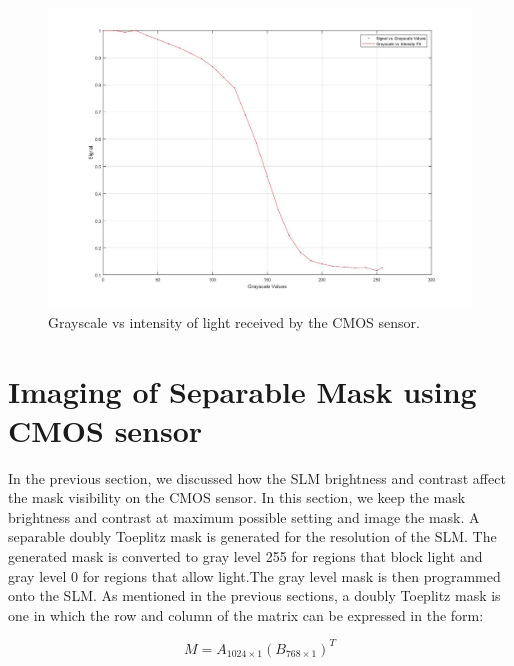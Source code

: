 \begin{figure}[!htbp]
\centering
\includegraphics[width = \linewidth]{pics/slm/grayscale_slm_graph}
\caption{Grayscale vs intensity of light received by the CMOS sensor.}
\label{fig:grayscale_slm_graph}
\end{figure}

\section{Imaging of Separable Mask using CMOS sensor}
In the previous section, we discussed how the SLM brightness and contrast affect the mask visibility on the CMOS sensor. In this section, we keep the mask brightness and contrast at maximum possible setting and image the mask. A separable doubly Toeplitz mask is generated for the resolution of the SLM. The generated mask is converted to gray level 255 for regions that block light and gray level 0 for regions that allow light.The gray level mask is then programmed onto the SLM. As mentioned in the previous sections, a doubly Toeplitz mask is one in which the row and column of the matrix can be expressed in the form:

$$
M = A_{1024\times 1}{(B_{768 \times 1})}^T
$$

